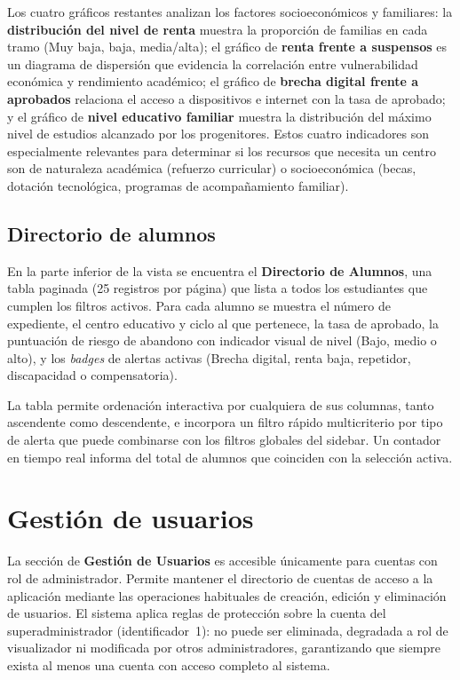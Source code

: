 Los cuatro gráficos restantes analizan los factores socioeconómicos y familiares: la \textbf{distribución del nivel de renta} muestra la proporción de familias en cada tramo (Muy baja, baja, media/alta); el gráfico de \textbf{renta frente a suspensos} es un diagrama de dispersión que evidencia la correlación entre vulnerabilidad económica y rendimiento académico; el gráfico de \textbf{brecha digital frente a aprobados} relaciona el acceso a dispositivos e internet con la tasa de aprobado; y el gráfico de \textbf{nivel educativo familiar} muestra la distribución del máximo nivel de estudios alcanzado por los progenitores. Estos cuatro indicadores son especialmente relevantes para determinar si los recursos que necesita un centro son de naturaleza académica (refuerzo curricular) o socioeconómica (becas, dotación tecnológica, programas de acompañamiento familiar).

\subsection{Directorio de alumnos}

En la parte inferior de la vista se encuentra el \textbf{Directorio de Alumnos}, una tabla paginada (25 registros por página) que lista a todos los estudiantes que cumplen los filtros activos. Para cada alumno se muestra el número de expediente, el centro educativo y ciclo al que pertenece, la tasa de aprobado, la puntuación de riesgo de abandono con indicador visual de nivel (Bajo, medio o alto), y los \textit{badges} de alertas activas (Brecha digital, renta baja, repetidor, discapacidad o compensatoria).

La tabla permite ordenación interactiva por cualquiera de sus columnas, tanto ascendente como descendente, e incorpora un filtro rápido multicriterio por tipo de alerta que puede combinarse con los filtros globales del sidebar. Un contador en tiempo real informa del total de alumnos que coinciden con la selección activa.

\section{Gestión de usuarios}

La sección de \textbf{Gestión de Usuarios} es accesible únicamente para cuentas con rol de administrador. Permite mantener el directorio de cuentas de acceso a la aplicación mediante las operaciones habituales de creación, edición y eliminación de usuarios. El sistema aplica reglas de protección sobre la cuenta del superadministrador (identificador~1): no puede ser eliminada, degradada a rol de visualizador ni modificada por otros administradores, garantizando que siempre exista al menos una cuenta con acceso completo al sistema.

